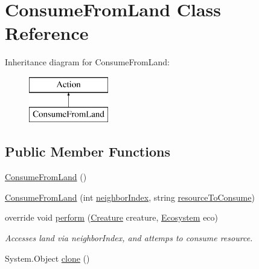 \hypertarget{class_consume_from_land}{}\section{Consume\+From\+Land Class Reference}
\label{class_consume_from_land}
Inheritance diagram for Consume\+From\+Land\+:\begin{figure}[H]
\begin{center}
\leavevmode
\includegraphics[height=2.000000cm]{class_consume_from_land}
\end{center}
\end{figure}
\subsection*{Public Member Functions}
\begin{DoxyCompactItemize}
\item 
\mbox{\hyperlink{class_consume_from_land_a5496a937e22a90235f5df516af9cd133}{Consume\+From\+Land}} ()
\item 
\mbox{\hyperlink{class_consume_from_land_a7168ad8a66c20529d60930de930bfafe}{Consume\+From\+Land}} (int \mbox{\hyperlink{class_consume_from_land_a645ca79e901a05c787df9e35d3a0318b}{neighbor\+Index}}, string \mbox{\hyperlink{class_consume_from_land_a4ef240b29ec3b427fca36c8de1fed24b}{resource\+To\+Consume}})
\item 
override void \mbox{\hyperlink{class_consume_from_land_a05e266fe8dd4d68b7bec63f53a7f513b}{perform}} (\mbox{\hyperlink{class_creature}{Creature}} creature, \mbox{\hyperlink{class_ecosystem}{Ecosystem}} eco)
\begin{DoxyCompactList}\small\item\em Accesses land via neighbor\+Index, and attemps to consume resource. \end{DoxyCompactList}\item 
System.\+Object \mbox{\hyperlink{class_consume_from_land_a352f47add666c68f6ab9c901280b9de1}{clone}} ()
\end{DoxyCompactItemize}

